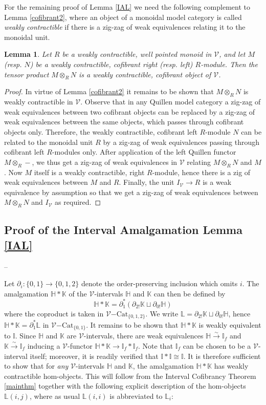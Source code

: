 \documentclass[10pt]{amsart}
\theoremstyle{plain}
\newtheorem{lma}[subsection]{Lemma}
\theoremstyle{remark}
\def\Vv{\mathcal{V}}
\def\Cat{\mathrm{Cat}}
\def\VCat{\Vv\mathrm{-}\Cat}
\def\Iso{\mathbb{I}}
\def\wIso{\Iso_f}
\def\eqv{\overset\sim\lrto}
\def\HH{\mathbb{H}}
\def\KK{\mathbb{K}}
\def\LL{\mathbb{L}}
\def\lrto{\longrightarrow}
\begin{document}
For the remaining proof of Lemma \ref{IAL} we need the following complement to Lemma \ref{cofibrant2}, where an object of a monoidal model category is called \emph{weakly contractible} if there is a zig-zag of weak equivalences relating it to the monoidal unit.

\begin{lma}\label{contractible}Let $R$ be a weakly contractible, well pointed monoid in $\Vv$, and let $M$ (resp. $N$) be a weakly contractible, cofibrant right (resp. left) $R$-module. Then the tensor product $M\otimes_RN$ is a weakly contractible, cofibrant object of $\Vv$.\end{lma}

\begin{proof}In virtue of Lemma \ref{cofibrant2} it remains to be shown that $M\otimes_RN$ is weakly contractible in $\Vv$. Observe that in any Quillen model category a zig-zag of weak equivalences between two cofibrant objects can be replaced by a zig-zag of weak equivalences between the same objects, which passes through cofibrant objects only. Therefore, the weakly contractible, cofibrant left $R$-module $N$ can be related to the monoidal unit $R$ by a zig-zag of weak equivalences passing through cofibrant left $R$-modules only. After application of the left Quillen functor $M\otimes_R-$, we thus get a zig-zag of weak equivalences in $\Vv$ relating $M\otimes_RN$ and $M$. Now $M$ itself is a weakly contractible, right $R$-module, hence there is a zig of weak equivalences between $M$ and $R$. Finally, the unit $I_\Vv\to R$ is a weak equivalence by assumption so that we get a zig-zag of weak equivalences between $M\otimes_RN$ and $I_\Vv$ as required.\end{proof}

\subsection{Proof of the Interval Amalgamation Lemma \ref{IAL}}\label{proofIAL}--\vspace{1ex}

Let $\partial_i:\{0,1\}\to\{0,1,2\}$ denote the order-preserving inclusion which omits $i$. The amalgamation $\HH*\KK$ of the $\Vv$-intervals $\HH$ and $\KK$ can then be defined by $$\HH*\KK=\partial_1^*(\partial_{2!}\KK\sqcup\partial_{0!}\HH)$$where the coproduct is taken in $\VCat_{\{0,1,2\}}$. We write $\LL=\partial_{2!}\KK\sqcup\partial_{0!}\HH$, hence $\HH*\KK=\partial_1^*\LL$ in $\VCat_{\{0,1\}}$. It remains to be shown that $\HH*\KK$ is weakly equivalent to $\Iso$. Since $\HH$ and $\KK$ are $\Vv$-intervals, there are weak equivalences $\HH\eqv\wIso$ and $\KK\eqv\wIso$ inducing a $\Vv$-functor $\HH*\KK\to\wIso*\wIso$. Note that $\wIso$ can be chosen to be a $\Vv$-interval itself; moreover, it is readily verified that $\Iso*\Iso\cong\Iso$. It is therefore sufficient to show that for \emph{any} $\Vv$-intervals $\HH$ and $\KK$, the amalgamation $\HH*\KK$ has weakly contractible hom-objects. This will follow from the Interval Cofibrancy Theorem \ref{mainthm} together with the following explicit description of the hom-objects $\LL(i,j)$, where as usual $\LL(i,i)$ is abbreviated to $\LL_i$:\vspace{1ex}
\end{document}
